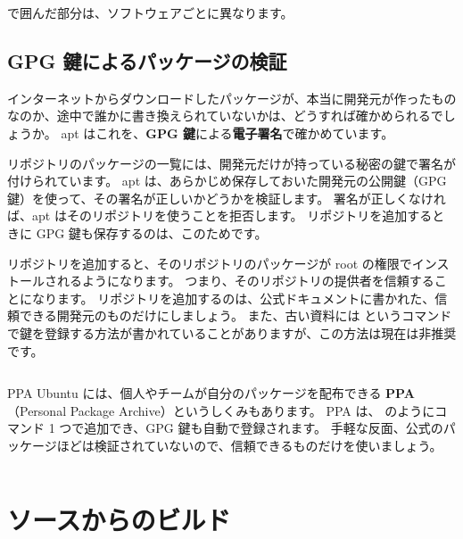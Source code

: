 
\cmd{\textless{}\textgreater{}} で囲んだ部分は、ソフトウェアごとに異なります。

\subsection{GPG 鍵によるパッケージの検証}

インターネットからダウンロードしたパッケージが、本当に開発元が作ったものなのか、途中で誰かに書き換えられていないかは、どうすれば確かめられるでしょうか。
apt はこれを、\textbf{GPG 鍵}による\textbf{電子署名}で確かめています。

リポジトリのパッケージの一覧には、開発元だけが持っている秘密の鍵で署名が付けられています。
apt は、あらかじめ保存しておいた開発元の公開鍵（GPG 鍵）を使って、その署名が正しいかどうかを検証します。
署名が正しくなければ、apt はそのリポジトリを使うことを拒否します。
リポジトリを追加するときに GPG 鍵も保存するのは、このためです。

\begin{caution}[リポジトリを追加するとき]
  リポジトリを追加すると、そのリポジトリのパッケージが root の権限でインストールされるようになります。
  つまり、そのリポジトリの提供者を信頼することになります。
  リポジトリを追加するのは、公式ドキュメントに書かれた、信頼できる開発元のものだけにしましょう。
  また、古い資料には  というコマンドで鍵を登録する方法が書かれていることがありますが、この方法は現在は非推奨です。
\end{caution}

\begin{column}{PPA}
  Ubuntu には、個人やチームが自分のパッケージを配布できる \textbf{PPA}（Personal Package Archive）というしくみもあります。
  PPA は、 のようにコマンド 1 つで追加でき、GPG 鍵も自動で登録されます。
  手軽な反面、公式のパッケージほどは検証されていないので、信頼できるものだけを使いましょう。
\end{column}

\section{ソースからのビルド}
\label{sec:package-build}


